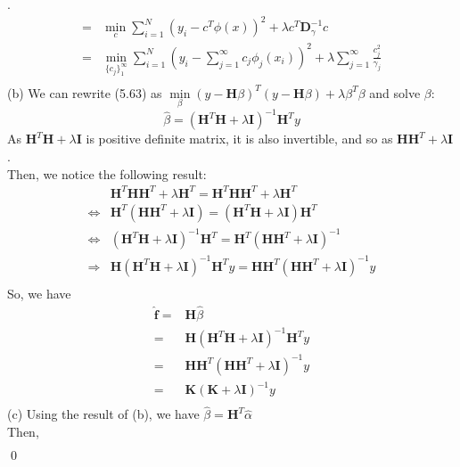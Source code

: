 \documentclass[12pt]{article}
\newenvironment{sol}
  {\par\vspace{3mm}\noindent{\it Solution}.}
  {\qed}
\begin{document}
\begin{sol}
\begin{equation*}
\begin{split}
=&\min_{c}\sum_{i=1}^N\left(y_i-c^T\phi(x)\right)^2+\lambda c^T\mathbf{D}_\gamma^{-1}c\\
=&\min_{\{c_j\}_1^{\infty}}\sum_{i=1}^N\left(y_i-\sum_{j=1}^{\infty}c_j\phi_j(x_i)\right)^2+\lambda\sum_{j=1}^{\infty}\frac{c_j^2}{\gamma_j}\\
\end{split}
\end{equation*}
(b) We can rewrite (5.63) as $\min\limits_{\beta}(y-\mathbf{H}\beta)^T(y-\mathbf{H}\beta)+\lambda\beta^T\beta$ and solve $\beta$:
$$\hat{\beta}=(\mathbf{H}^T\mathbf{H}+\lambda\mathbf{I})^{-1}\mathbf{H}^Ty$$
As $\mathbf{H}^T\mathbf{H}+\lambda\mathbf{I}$ is positive definite matrix, it is also invertible, and so as $\mathbf{H}\mathbf{H}^T+\lambda\mathbf{I}$.\\
Then, we notice the following result:
\begin{equation*}
\begin{split}
&\mathbf{H}^T\mathbf{H}\mathbf{H}^T+\lambda\mathbf{H}^T=\mathbf{H}^T\mathbf{H}\mathbf{H}^T+\lambda\mathbf{H}^T\\
\iff &\mathbf{H}^T(\mathbf{H}\mathbf{H}^T+\lambda\mathbf{I})=(\mathbf{H}^T\mathbf{H}+\lambda\mathbf{I})\mathbf{H}^T\\
\iff &(\mathbf{H}^T\mathbf{H}+\lambda\mathbf{I})^{-1}\mathbf{H}^T=\mathbf{H}^T(\mathbf{H}\mathbf{H}^T+\lambda\mathbf{I})^{-1}\\
\Longrightarrow &\mathbf{H}(\mathbf{H}^T\mathbf{H}+\lambda\mathbf{I})^{-1}\mathbf{H}^Ty=\mathbf{H}\mathbf{H}^T(\mathbf{H}\mathbf{H}^T+\lambda\mathbf{I})^{-1}y\\
\end{split}
\end{equation*}
So, we have
\begin{equation*}
\begin{split}
\hat{\mathbf{f}}=&\mathbf{H}\hat{\beta}\\
=&\mathbf{H}(\mathbf{H}^T\mathbf{H}+\lambda\mathbf{I})^{-1}\mathbf{H}^Ty\\
=&\mathbf{H}\mathbf{H}^T(\mathbf{H}\mathbf{H}^T+\lambda\mathbf{I})^{-1}y\\
=&\mathbf{K}(\mathbf{K}+\lambda\mathbf{I})^{-1}y\\
\end{split}
\end{equation*}
(c) Using the result of (b), we have $\hat{\beta}=\mathbf{H}^T\hat{\alpha}$\\
Then,
\begin{equation*}
\begin{split}

\end{split}
\end{equation*}
\end{sol}
\end{document}

